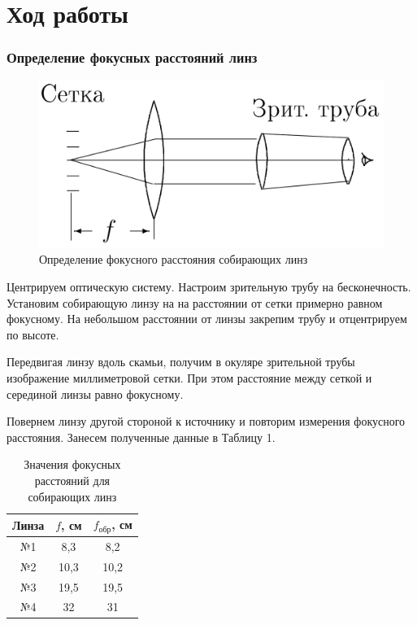 \documentclass[a4paper,12pt]{article}
\begin{document}
\section*{Ход работы}

\subsubsection*{Определение фокусных расстояний линз}

\begin{figure} 
	\includegraphics[width=\linewidth]{fig1}
	\caption{Определение фокусного расстояния собирающих линз}
	\label{collecting_lens}
\end{figure}
Центрируем оптическую систему. Настроим зрительную трубу на бесконечность. Установим собирающую линзу на на расстоянии от сетки примерно равном фокусному. На небольшом расстоянии от линзы закрепим трубу и отцентрируем по высоте.

Передвигая линзу вдоль скамьи, получим в окуляре зрительной трубы изображение миллиметровой сетки. При этом расстояние между сеткой и серединой линзы равно фокусному.

Повернем линзу другой стороной к источнику и повторим измерения фокусного расстояния. Занесем полученные данные в Таблицу 1.

\begin{table}[h]
\label{collecting_focuses}
	\begin{center}
	\caption{Значения фокусных расстояний для собирающих линз}
		\begin{tabular}{|c|c|c|}
		\hline
		\textbf{Линза} & \textbf{$f$, см} & \textbf{$f_{обр}$, см} \\ 		\hline
		№1             & 8,3            & 8,2                 \\ 	\hline
		№2             & 10,3           & 10,2                \\ \hline
		№3             & 19,5           & 19,5                \\ \hline
		№4             & 32             & 31                  \\ \hline
		\end{tabular}

	\end{center}
\end{table}
\end{document}
